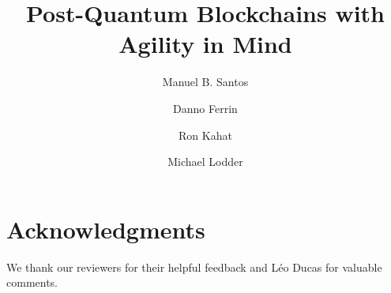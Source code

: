 \documentclass[runningheads]{llncs}
\begin{document}
%
\title{Post-Quantum Blockchains with Agility in Mind}
%
%
\ifanonym
    \author{}
\else
    \author{
        Manuel B. Santos \and
        Danno Ferrin \and
        Ron Kahat \and
        Michael Lodder
    }
\fi
%
\ifanonym
\else
\fi
%
\ifanonym
    \institute{}
\else
\fi
%
\maketitle              %
%
\vspace{-7pt}












% 





\section*{Acknowledgments}
We thank our reviewers for their helpful feedback and Léo Ducas for valuable comments.
%
%
%


\end{document}
